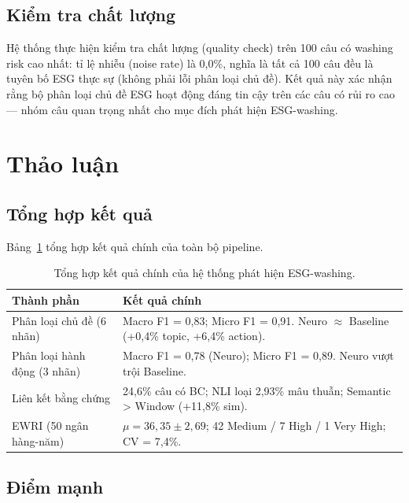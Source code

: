 \subsection{Kiểm tra chất lượng}
\label{subsec:quality_check}

Hệ thống thực hiện kiểm tra chất lượng (quality check) trên 100 câu có washing risk cao nhất: tỉ lệ nhiễu (noise rate) là 0,0\%, nghĩa là tất cả 100 câu đều là tuyên bố ESG thực sự (không phải lỗi phân loại chủ đề). Kết quả này xác nhận rằng bộ phân loại chủ đề ESG hoạt động đáng tin cậy trên các câu có rủi ro cao --- nhóm câu quan trọng nhất cho mục đích phát hiện ESG-washing.


\section{Thảo luận}
\label{sec:discussion}

\subsection{Tổng hợp kết quả}
\label{subsec:results_summary}

Bảng~\ref{tab:results_summary} tổng hợp kết quả chính của toàn bộ pipeline.

\begin{table}[H]
\centering
\caption{Tổng hợp kết quả chính của hệ thống phát hiện ESG-washing.}
\label{tab:results_summary}
\small
\begin{tabular}{p{4.5cm}p{8cm}}
\toprule
\textbf{Thành phần} & \textbf{Kết quả chính} \\
\midrule
Phân loại chủ đề (6 nhãn)
    & Macro F1 = 0,83; Micro F1 = 0,91. Neuro $\approx$ Baseline (+0,4\% topic, +6,4\% action). \\
Phân loại hành động (3 nhãn)
    & Macro F1 = 0,78 (Neuro); Micro F1 = 0,89. Neuro vượt trội Baseline. \\
Liên kết bằng chứng
    & 24,6\% câu có BC; NLI loại 2,93\% mâu thuẫn; Semantic > Window (+11,8\% sim). \\
EWRI (50 ngân hàng-năm)
    & $\mu = 36{,}35 \pm 2{,}69$; 42 Medium / 7 High / 1 Very High; CV = 7,4\%. \\
\bottomrule
\end{tabular}
\end{table}


\subsection{Điểm mạnh}
\label{subsec:strengths}

